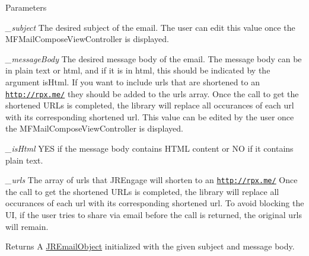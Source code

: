 \begin{DoxyParams}{Parameters}
\item[{\em \_\-subject}]The desired subject of the email. The user can edit this value once the MFMailComposeViewController is displayed.\item[{\em \_\-messageBody}]The desired message body of the email. The message body can be in plain text or html, and if it is in html, this should be indicated by the argument {\ttfamily isHtml}. If you want to include urls that are shortened to an \href{http://rpxnow.com/docs/iphone#shortenUrls}{\tt http://rpx.me/} they should be added to the {\ttfamily urls} array. Once the call to get the shortened URLs is completed, the library will replace all occurances of each url with its corresponding shortened url. This value can be edited by the user once the MFMailComposeViewController is displayed.\item[{\em \_\-isHtml}]YES if the message body contains HTML content or NO if it contains plain text.\item[{\em \_\-urls}]The array of urls that JREngage will shorten to an \href{http://rpxnow.com/docs/iphone#shortenUrls}{\tt http://rpx.me/} Once the call to get the shortened URLs is completed, the library will replace all occurances of each url with its corresponding shortened url. To avoid blocking the UI, if the user tries to share via email before the call is returned, the original urls will remain.\end{DoxyParams}
\begin{DoxyReturn}{Returns}
A \hyperlink{interface_j_r_email_object}{JREmailObject} initialized with the given subject and message body. 
\end{DoxyReturn}


